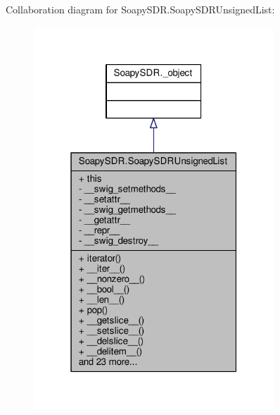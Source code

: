Collaboration diagram for Soapy\+S\+D\+R.\+Soapy\+S\+D\+R\+Unsigned\+List\+:
\nopagebreak
\begin{figure}[H]
\begin{center}
\leavevmode
\includegraphics[width=256pt]{d3/de8/classSoapySDR_1_1SoapySDRUnsignedList__coll__graph}
\end{center}
\end{figure}
